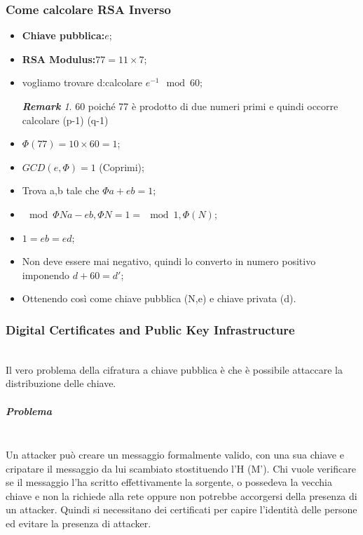 \documentclass{book}
\theoremstyle{remark}
\newtheorem*{remark}{\textbf{Remark}}
\begin{document}
\subsubsection{Come calcolare RSA Inverso}
\begin{itemize}
	\item \textbf{Chiave pubblica:}\(e\);\@
	\item \textbf{RSA Modulus:}\(77=11\times 7\);\@
	\item vogliamo trovare d:\@dobbiamo calcolare \(e^{-1}\mod{60}\);\@
	      \begin{remark}
		      \(60\) poiché 77 è prodotto di due numeri primi e quindi occorre calcolare (p-1) (q-1)
	      \end{remark}
	\item \(\Phi(77)=10\times 60=1\);\@
	\item \(GCD(e,\Phi)=1\) (Coprimi);\@
	\item Trova a,b tale che \(\Phi a+e b = 1\);\@
	\item \(\mod{\Phi{N}a-eb,\Phi{N}}=1= \mod{1,\Phi(N)}\);\@
	\item \(1=eb=ed\);\@
	\item Non deve essere mai negativo, quindi lo converto in numero positivo imponendo \(d+60=d'\);\@
	\item Ottenendo così come chiave pubblica (N,e) e chiave privata (d)\@.
\end{itemize}
\subsubsection{Digital Certificates and Public Key Infrastructure}\mbox{}\\
Il vero problema della cifratura a chiave pubblica è che è possibile attaccare la distribuzione delle chiave\@.
\subparagraph{Problema}\mbox{}\\
Un attacker può creare un messaggio formalmente valido, con una sua chiave e cripatare il messaggio da lui scambiato stostituendo l'H (M')\@. Chi vuole verificare se il messaggio l'ha scritto effettivamente la sorgente, o possedeva la vecchia chiave e non la richiede alla rete oppure non potrebbe accorgersi della presenza di un attacker\@. Quindi si necessitano dei certificati per capire l'identità delle persone ed evitare la presenza di attacker\@.
\end{document}
